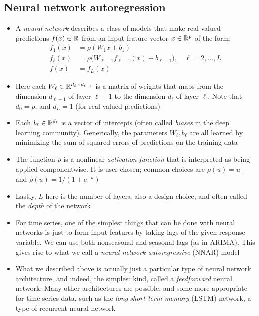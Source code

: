 \documentclass{article}
\begin{document}
\subsection{Neural network autoregression}

\begin{itemize}
\item A \emph{neural network} describes a class of models that make real-valued
  predictions $f(x) \in \mathbb{R}$ from an input feature vector $x \in \mathbb{R}^p$ of the
  form:  
  \begin{align*}
  f_1(x) &= \rho(W_1 x + b_1) \\
  f_\ell(x) &= \rho \Big( W_{\ell-1} f_{\ell-1}(x) + b_{\ell-1} \Big), \quad
              \ell = 2,\dots,L \\
  f(x) &= f_L(x)
  \end{align*}

\item Here each $W_\ell \in \mathbb{R}^{d_\ell \times d_{\ell-1}}$ is a matrix of
  weights that maps from the dimension $d_{\ell-1}$ of layer $\ell-1$ to the
  dimension $d_\ell$ of layer $\ell$. Note that $d_0 = p$, and $d_L = 1$ (for
  real-valued predictions)

\item Each $b_\ell \in \mathbb{R}^{d_\ell}$ is a vector of intercepts (often called
  \emph{biases} in the deep learning community). Generically, the parameters
  $W_\ell,b_\ell$ are all learned by minimizing the sum of squared errors of
  predictions on the training data 

\item The function $\rho$ is a nonlinear \emph{activation function} that is 
  interpreted as being applied componentwise. It is user-chosen; common choices 
  are $\rho(u) = u_+$ and $\rho(u) = 1/(1+e^{-u})$

\item Lastly, $L$ here is the number of layers, also a design choice, and often 
  called the \emph{depth} of the network   

\item For time series, one of the simplest things that can be done with neural
  networks is just to form input features by taking lags of the given response
  variable. We can use both nonseasonal and seasonal lags (as in ARIMA). This
  gives rise to what we call a \emph{neural network autoregressive} (NNAR) model  

\item What we described above is actually just a particular type of neural
  network architecture, and indeed, the simplest kind, called a
  \emph{feedforward} neural network. Many other architectures are possible, and
  some more appropriate for time series data, such as the \emph{long short term
    memory} (LSTM) network, a type of recurrent neural network


\end{itemize}
\end{document}
